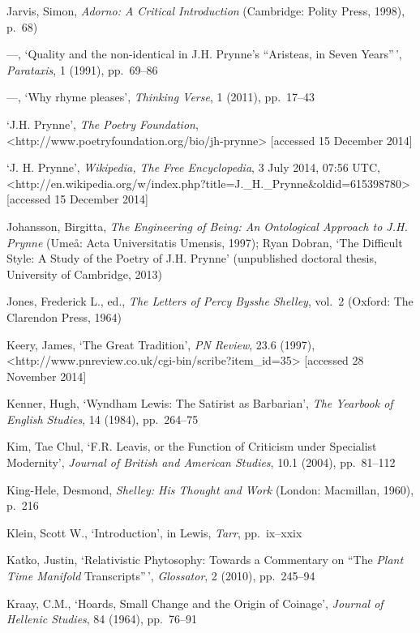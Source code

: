 \documentclass[]{article}
\begin{document}
Jarvis, Simon, \emph{Adorno: A Critical Introduction} (Cambridge: Polity
Press, 1998), p.~68)

---, `Quality and the non-identical in J.H. Prynne's ``Aristeas, in
Seven Years''\,', \emph{Parataxis}, 1 (1991), pp.~69--86

---, `Why rhyme pleases', \emph{Thinking Verse}, 1 (2011), pp.~17--43

`J.H. Prynne', \emph{The Poetry Foundation},\\
\textless{}http://www.poetryfoundation.org/bio/jh-prynne\textgreater{}
{[}accessed 15 December 2014{]}

`J. H. Prynne', \emph{Wikipedia, The Free Encyclopedia}, 3 July 2014,
07:56 UTC,\\
\textless{}http://en.wikipedia.org/w/index.php?title=J.\_H.\_Prynne\&oldid=615398780\textgreater{}
{[}accessed 15 December 2014{]}

Johansson, Birgitta, \emph{The Engineering of Being: An Ontological
Approach to J.H. Prynne} (Umeå: Acta Universitatis Umensis, 1997); Ryan
Dobran, `The Difficult Style: A Study of the Poetry of J.H. Prynne'
(unpublished doctoral thesis, University of Cambridge, 2013)

Jones, Frederick L., ed., \emph{The Letters of Percy Bysshe Shelley},
vol.~2 (Oxford: The Clarendon Press, 1964)

Keery, James, `The Great Tradition', \emph{PN Review}, 23.6 (1997),\\
\textless{}http://www.pnreview.co.uk/cgi-bin/scribe?item\_id=35\textgreater{}
{[}accessed 28 November 2014{]}

Kenner, Hugh, `Wyndham Lewis: The Satirist as Barbarian', \emph{The
Yearbook of English Studies}, 14 (1984), pp.~264--75

Kim, Tae Chul, `F.R. Leavis, or the Function of Criticism under
Specialist Modernity', \emph{Journal of British and American Studies},
10.1 (2004), pp.~81--112

King-Hele, Desmond, \emph{Shelley: His Thought and Work} (London:
Macmillan, 1960), p.~216

Klein, Scott W., `Introduction', in Lewis, \emph{Tarr}, pp.~ix--xxix

Katko, Justin, `Relativistic Phytosophy: Towards a Commentary on ``The
\emph{Plant Time Manifold} Transcripts''\,', \emph{Glossator}, 2 (2010),
pp.~245--94

Kraay, C.M., `Hoards, Small Change and the Origin of Coinage',
\emph{Journal of Hellenic Studies}, 84 (1964), pp.~76--91
\end{document}
